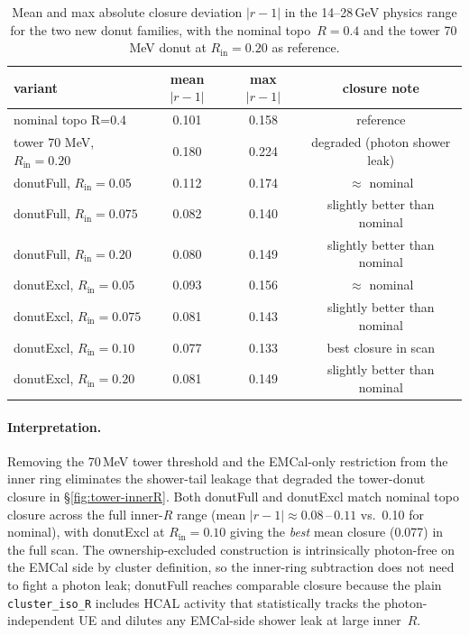 \documentclass[11pt,a4paper]{article}
\begin{document}
\begin{table}[H]
\centering\small
\caption{Mean and max absolute closure deviation $|r-1|$ in the
14--28\,GeV physics range for the two new donut families, with the
nominal topo~$R=0.4$ and the tower 70\,MeV donut at $R_\text{in}=0.20$
as reference.}
\label{tab:donut_summary}
\begin{tabular}{l c c c}
\toprule
variant & mean $|r-1|$ & max $|r-1|$ & closure note \\
\midrule
nominal topo R=0.4        & 0.101 & 0.158 & reference \\
tower 70 MeV, $R_\text{in}=0.20$ & 0.180 & 0.224 & degraded (photon shower leak) \\
\midrule
donutFull, $R_\text{in}=0.05$  & 0.112 & 0.174 & $\approx$ nominal \\
donutFull, $R_\text{in}=0.075$ & 0.082 & 0.140 & slightly better than nominal \\
donutFull, $R_\text{in}=0.20$  & 0.080 & 0.149 & slightly better than nominal \\
\midrule
donutExcl, $R_\text{in}=0.05$  & 0.093 & 0.156 & $\approx$ nominal \\
donutExcl, $R_\text{in}=0.075$ & 0.081 & 0.143 & slightly better than nominal \\
donutExcl, $R_\text{in}=0.10$  & 0.077 & 0.133 & best closure in scan \\
donutExcl, $R_\text{in}=0.20$  & 0.081 & 0.149 & slightly better than nominal \\
\bottomrule
\end{tabular}
\end{table}

\paragraph{Interpretation.}
Removing the 70\,MeV tower threshold and the EMCal-only restriction
from the inner ring eliminates the shower-tail leakage that degraded
the tower-donut closure in \S\ref{fig:tower-innerR}. Both donutFull
and donutExcl match nominal topo closure across the full inner-$R$
range (mean $|r-1|\!\approx\!0.08$\,--\,$0.11$ vs.\ 0.10 for nominal),
with donutExcl at $R_\text{in}=0.10$ giving the \emph{best} mean
closure (0.077) in the full scan. The ownership-excluded construction
is intrinsically photon-free on the EMCal side by cluster definition,
so the inner-ring subtraction does not need to fight a photon leak;
donutFull reaches comparable closure because the plain
\texttt{cluster\_iso\_R} includes HCAL activity that statistically
tracks the photon-independent UE and dilutes any EMCal-side shower
leak at large inner~$R$.
\end{document}
